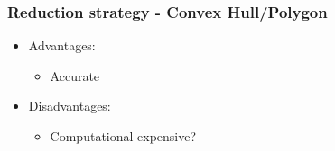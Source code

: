 \begin{frame}
\frametitle{Reduction strategy - Convex Hull/Polygon}
\begin{multicols}{2}
	\begin{itemize}
		\item Advantages:
		\begin{itemize}
			\item Accurate
			\linebreak
		\end{itemize}
	\end{itemize}
\columnbreak
	\begin{itemize}
		\item Disadvantages:
		\begin{itemize}
			\item Computational expensive?
			\linebreak
		\end{itemize}
	\end{itemize}
\end{multicols}

\end{frame}